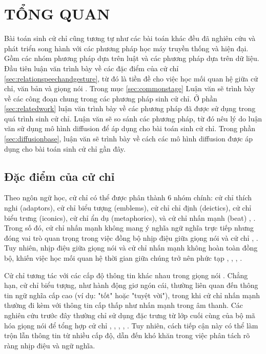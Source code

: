 \chapter{TỔNG QUAN}
\label{Chapter2}

Bài toán sinh cử chỉ cũng tương tự như các bài toán khác đều đã nghiên cứu và phát triển song hành với các phương pháp học máy truyền thống và hiện đại. Gồm các nhóm phương pháp dựa trên luật và các phương pháp dựa trên dữ liệu.  Đầu tiên luận văn 
trình bày về các đặc điểm của cử chỉ
 \autoref{sec:relationspeechandgesture}, từ đó là tiền đề 
cho việc học mối quan hệ giữa cử chỉ, văn bản và giọng nói 
. Trong mục \autoref{sec:commonstage} Luận văn sẽ trình bày về các công đoạn chung trong các phương pháp sinh cử chỉ.
Ở phần \autoref{sec:relatedwork} luận văn trình bày về các phương pháp đã được sử dụng trong quá trình sinh cử chỉ. Luận văn sẽ so sánh các phương pháp, từ đó nêu lý do luận văn sử dụng mô hình diffusion để áp dụng cho bài toán sinh cử chỉ.
Trong phần \autoref{sec:diffusionbase}, luận văn sẽ trình bày về cách các mô hình diffusion được áp dụng cho bài toán sinh cử chỉ gần đây.

\section{Đặc điểm của cử chỉ}
\label{sec:relationspeechandgesture}

Theo ngôn ngữ học, cử chỉ có thể được phân thành 6 nhóm chính: cử chỉ thích nghi (adaptors), cử chỉ biểu tượng (emblems), cử chỉ chỉ định (deictics), cử chỉ biểu trưng (iconics), cử chỉ ẩn dụ (metaphorics), và cử chỉ nhấn mạnh (beat) \cite{ekman1969repertoire}, \cite{sebeok2011advances}. Trong số đó, cử chỉ nhấn mạnh không mang ý nghĩa ngữ nghĩa trực tiếp nhưng đóng vai trò quan trọng trong việc đồng bộ nhịp điệu giữa giọng nói và cử chỉ \cite{kipp2005gesture}, \cite{sebeok2011advances}. Tuy nhiên, nhịp điệu giữa giọng nói và cử chỉ nhấn mạnh không hoàn toàn đồng bộ, khiến việc học mối quan hệ thời gian giữa chúng trở nên phức tạp \cite{mcclave1994gestural}, \cite{bhattacharya2021speech2affectivegestures}, \cite{kucherenko2020gesticulator}, \cite{yoon2020speech}.

Cử chỉ tương tác với các cấp độ thông tin khác nhau trong giọng nói \cite{sebeok2011advances}. Chẳng hạn, cử chỉ biểu tượng, như hành động giơ ngón cái, thường liên quan đến thông tin ngữ nghĩa cấp cao (ví dụ: "tốt" hoặc "tuyệt vời"), trong khi cử chỉ nhấn mạnh thường đi kèm với thông tin cấp thấp như nhấn mạnh trong âm thanh. Các nghiên cứu trước đây thường chỉ sử dụng đặc trưng từ lớp cuối cùng của bộ mã hóa giọng nói để tổng hợp cử chỉ \cite{alexanderson2020style}, \cite{bhattacharya2021speech2affectivegestures}, \cite{kucherenko2021large}, \cite{qian2021speech}, \cite{yoon2022genea}. Tuy nhiên, cách tiếp cận này có thể làm trộn lẫn thông tin từ nhiều cấp độ, dẫn đến khó khăn trong việc phân tách rõ ràng nhịp điệu và ngữ nghĩa.

